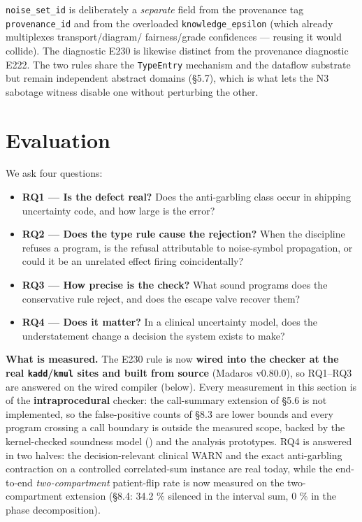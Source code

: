 \documentclass[sigplan,review,anonymous,10pt]{acmart}
\begin{document}
\texttt{noise\_set\_id} is deliberately a \emph{separate} field from the provenance tag \texttt{provenance\_id} and from the overloaded \texttt{knowledge\_epsilon} (which already multiplexes transport/diagram/ fairness/grade confidences --- reusing it would collide). The diagnostic E230 is likewise distinct from the provenance diagnostic E222. The two rules share the \texttt{TypeEntry} mechanism and the dataflow substrate but remain independent abstract domains (§5.7), which is what lets the N3 sabotage witness disable one without perturbing the other.

\section{Evaluation}

We ask four questions:

\begin{itemize}
  \item \textbf{RQ1 --- Is the defect real?} Does the anti-garbling class occur in shipping uncertainty code, and how large is the error?
  \item \textbf{RQ2 --- Does the type rule cause the rejection?} When the discipline refuses a program, is the refusal attributable to noise-symbol propagation, or could it be an unrelated effect firing coincidentally?
  \item \textbf{RQ3 --- How precise is the check?} What sound programs does the conservative rule reject, and does the escape valve recover them?
  \item \textbf{RQ4 --- Does it matter?} In a clinical uncertainty model, does the understatement change a decision the system exists to make?
\end{itemize}

\textbf{What is measured.} The E230 rule is now \textbf{wired into the checker at the real \texttt{kadd}/\texttt{kmul} sites and built from source} (Madaros v0.80.0), so RQ1--RQ3 are answered on the wired compiler (below). Every measurement in this section is of the \textbf{intraprocedural} checker: the call-summary extension of §5.6 is not implemented, so the false-positive counts of §8.3 are lower bounds and every program crossing a call boundary is outside the measured scope, backed by the kernel-checked soundness model () and the analysis prototypes. RQ4 is answered in two halves: the decision-relevant clinical WARN and the exact anti-garbling contraction on a controlled correlated-sum instance are real today, while the end-to-end \emph{two-compartment} patient-flip rate is now measured on the two-compartment extension (§8.4: 34.2 \% silenced in the interval sum, 0 \% in the phase decomposition).
\end{document}
